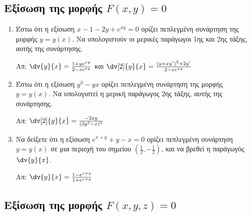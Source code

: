 \subsection{Εξίσωση της μορφής \ensuremath{F(x,y)=0}}

\begin{enumerate}
    \item Έστω ότι η εξίσωση $ x-1-2y+e^{xy} = 0 $ ορίζει πεπλεγμένη συνάρτηση της 
        μορφής $ y = y(x) $. Να υπολογιστούν οι μερικές παράγωγοι 
        1ης και 2ης τάξης, αυτής της συνάρτησης.

        \hfill Απ: $ \dv{y}{x} = \frac{1+ye^{xy}}{2-xe^{xy}} $ και $ \dv[2]{y}{x}
        = \frac{(y+xy')^{2}+2y'}{2-xe^{xy}} $ 

    \item Έστω ότι η εξίσωση $ y^{3} - yx $ ορίζει πεπλεγμένη συνάρτηση της 
        μορφής $ y = y(x) $. Να υπολογιστεί η μερική παράγωγος 2ης τάξης, αυτής 
        της συνάρτησης.

        \hfill Απ: $ \dv[2]{y}{x} = \frac{ -2xy }{ (3y^{2} - x)^{3} }  $ 

    \item Να δείξετε ότι η εξίσωση $ e^{x+y} + y- x = 0 $ ορίζει πεπλεγμένη συνάρτηση 
        $ y=y(x) $ σε μια περιοχή του σημείου $ \left(\frac{1}{2}, - 
        \frac{1}{2}\right) $, και να βρεθεί η παράγωγός $ \dv{y}{x} $.

        \hfill Απ: $ \dv{y}{x} = \frac{1-e^{x+y}}{1+e^{x+y}} $  
\end{enumerate}

\subsection{Εξίσωση της μορφής \ensuremath{F(x,y,z)=0}}

